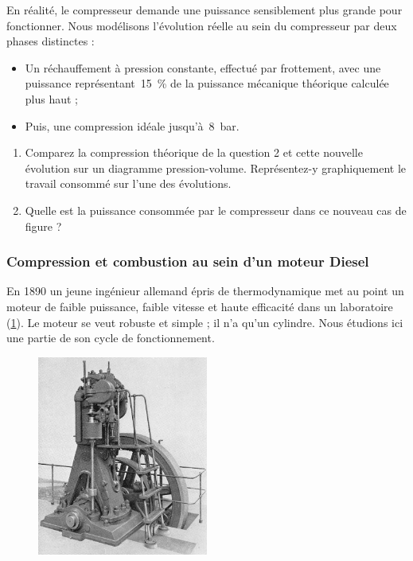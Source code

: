	En réalité, le compresseur demande une puissance sensiblement plus grande pour fonctionner. Nous modélisons l’évolution réelle au sein du compresseur par deux phases distinctes : 

	\begin{itemize}
		\item Un réchauffement à pression constante, effectué par frottement, avec une puissance représentant~\SI{15}{\percent} de la puissance mécanique théorique calculée plus haut ; 
		\item Puis, une compression idéale jusqu’à~\SI{8}{\bar}.
	\end{itemize}
	
	\begin{enumerate}
		\item Comparez la compression théorique de la question 2 et cette nouvelle évolution sur un diagramme pression-volume. Représentez-y graphiquement le travail consommé sur l’une des évolutions.
		\item Quelle est la puissance consommée par le compresseur dans ce nouveau cas de figure ?
	\end{enumerate}


\subsubsection{Compression et combustion au sein d’un moteur Diesel}
\label{exo_compression_combustion_diesel}

	En 1890 un jeune ingénieur allemand épris de thermodynamique met au point un moteur de faible puissance, faible vitesse et haute efficacité dans un laboratoire (\cref{fig_exo_moteur_diesel}). Le moteur se veut robuste et simple ; il n’a qu’un cylindre. Nous étudions ici une partie de son cycle de fonctionnement. %
	
	\begin{figure}
		\begin{center}
			\includegraphics[width=0.5\textwidth]{images/Dieselmotor_1898_retouched.jpg}
		\end{center}
		\label{fig_exo_moteur_diesel}
	\end{figure}
	
